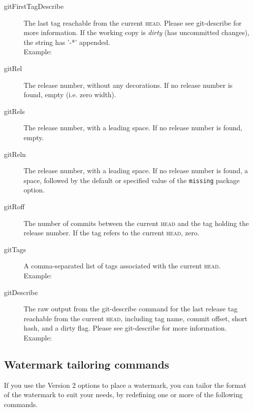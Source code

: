 \documentclass[a4paper,12pt,twoside,openany]{memoir}
\begin{document}
\begin{description}

\item[gitFirstTagDescribe]
	The last tag reachable from the current \textsc{head}.
    Please see git-describe for more information.
    If the working copy is \textit{dirty} (has uncommitted changes),
    the string has '-*' appended.\\
    Example: \textit{\gitFirstTagDescribe}

\item[gitRel]
    The release number, without any decorations.
    If no release number is found, empty (i.e. zero width).

\item[gitRels]
    The release number, with a leading space.
    If no release number is found, empty.

\item[gitReln]
    The release number, with a leading space.
    If no release number is found, a space,
    followed by the default or specified value of
    the \texttt{missing} package option.

\item[gitRoff]
    The number of commits between the current \textsc{head}
    and the tag holding the release number.
    If the tag refers to the current \textsc{head}, zero.

\item[gitTags]
    A comma-separated list of tags associated with the current \textsc{head}.\\
    Example: \textit{\gitTags}

\item[gitDescribe]
    The raw output from the git-describe command for the last release tag
    reachable from the current \textsc{head}, including tag name, commit offset,
    short hash, and a dirty flag.
    Please see git-describe for more information.
    Example: \textit{\gitDescribe}

\end{description}

\clearpage
\subsection{Watermark tailoring commands}

If you use the Version 2 options to place a watermark,
you can tailor the format of the watermark to suit your needs,
by redefining one or more of the following commands.
\end{document}
